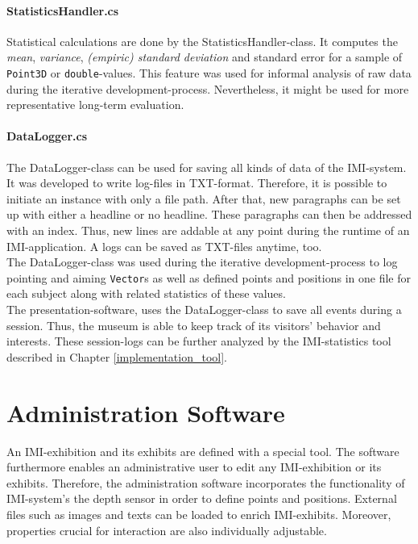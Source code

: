 
\paragraph{StatisticsHandler.cs} Statistical calculations are done by the StatisticsHandler-class. It computes the \textit{mean}, \textit{variance}, \textit{(empiric) standard deviation} and standard error for a sample of \texttt{Point3D} or \texttt{double}-values. This feature was used for informal analysis of raw data during the iterative development-process. Nevertheless, it might be used for more representative long-term evaluation. 


\paragraph{DataLogger.cs} The DataLogger-class can be used for saving all kinds of data of the \ac{IMI}-system. It was developed to write log-files in TXT-format. Therefore, it is possible to initiate an instance with only a file path. After that, new paragraphs can be set up with either a headline or no headline. These paragraphs can then be addressed with an index. Thus, new lines are addable at any point during the runtime of an \ac{IMI}-application. A logs can be saved as TXT-files anytime, too.
\\
The DataLogger-class was used during the iterative development-process to log pointing and aiming \texttt{Vector}s as well as defined points and positions in one file for each subject along with related statistics of these values.
\\
The presentation-software, uses the DataLogger-class to save all events during a session. Thus, the museum is able to keep track of its visitors' behavior and interests. These session-logs can be further analyzed by the \ac{IMI}-statistics tool described in Chapter \ref{implementation_tool}.


\section{Administration Software}
\label{implementation_administration}

An \ac{IMI}-exhibition and its exhibits are defined with a special tool. The software furthermore enables an administrative user to edit any \ac{IMI}-exhibition or its exhibits. Therefore, the administration software incorporates the functionality of \ac{IMI}-system's the depth sensor in order to define points and positions. External files such as images and texts can be loaded to enrich \ac{IMI}-exhibits. Moreover, properties crucial for interaction are also individually adjustable.

